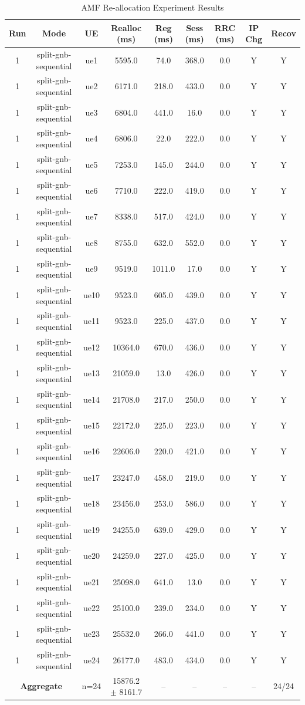 \begin{table}[ht]
\centering
\begin{tabular}{|c|c|c|c|c|c|c|c|c|}
\hline
Run & Mode & UE & Realloc (ms) & Reg (ms) & Sess (ms) & RRC (ms) & IP Chg & Recov \\
\hline
1 & split-gnb-sequential & ue1 & 5595.0 & 74.0 & 368.0 & 0.0 & Y & Y \\
1 & split-gnb-sequential & ue2 & 6171.0 & 218.0 & 433.0 & 0.0 & Y & Y \\
1 & split-gnb-sequential & ue3 & 6804.0 & 441.0 & 16.0 & 0.0 & Y & Y \\
1 & split-gnb-sequential & ue4 & 6806.0 & 22.0 & 222.0 & 0.0 & Y & Y \\
1 & split-gnb-sequential & ue5 & 7253.0 & 145.0 & 244.0 & 0.0 & Y & Y \\
1 & split-gnb-sequential & ue6 & 7710.0 & 222.0 & 419.0 & 0.0 & Y & Y \\
1 & split-gnb-sequential & ue7 & 8338.0 & 517.0 & 424.0 & 0.0 & Y & Y \\
1 & split-gnb-sequential & ue8 & 8755.0 & 632.0 & 552.0 & 0.0 & Y & Y \\
1 & split-gnb-sequential & ue9 & 9519.0 & 1011.0 & 17.0 & 0.0 & Y & Y \\
1 & split-gnb-sequential & ue10 & 9523.0 & 605.0 & 439.0 & 0.0 & Y & Y \\
1 & split-gnb-sequential & ue11 & 9523.0 & 225.0 & 437.0 & 0.0 & Y & Y \\
1 & split-gnb-sequential & ue12 & 10364.0 & 670.0 & 436.0 & 0.0 & Y & Y \\
1 & split-gnb-sequential & ue13 & 21059.0 & 13.0 & 426.0 & 0.0 & Y & Y \\
1 & split-gnb-sequential & ue14 & 21708.0 & 217.0 & 250.0 & 0.0 & Y & Y \\
1 & split-gnb-sequential & ue15 & 22172.0 & 225.0 & 223.0 & 0.0 & Y & Y \\
1 & split-gnb-sequential & ue16 & 22606.0 & 220.0 & 421.0 & 0.0 & Y & Y \\
1 & split-gnb-sequential & ue17 & 23247.0 & 458.0 & 219.0 & 0.0 & Y & Y \\
1 & split-gnb-sequential & ue18 & 23456.0 & 253.0 & 586.0 & 0.0 & Y & Y \\
1 & split-gnb-sequential & ue19 & 24255.0 & 639.0 & 429.0 & 0.0 & Y & Y \\
1 & split-gnb-sequential & ue20 & 24259.0 & 227.0 & 425.0 & 0.0 & Y & Y \\
1 & split-gnb-sequential & ue21 & 25098.0 & 641.0 & 13.0 & 0.0 & Y & Y \\
1 & split-gnb-sequential & ue22 & 25100.0 & 239.0 & 234.0 & 0.0 & Y & Y \\
1 & split-gnb-sequential & ue23 & 25532.0 & 266.0 & 441.0 & 0.0 & Y & Y \\
1 & split-gnb-sequential & ue24 & 26177.0 & 483.0 & 434.0 & 0.0 & Y & Y \\
\multicolumn{2}{|c|}{\textbf{Aggregate}} & n=24 & 15876.2 $\pm$ 8161.7 & -- & -- & -- & -- & 24/24 \\
\hline
\end{tabular}
\caption{AMF Re-allocation Experiment Results}
\label{tab:amf_realloc}
\end{table}
